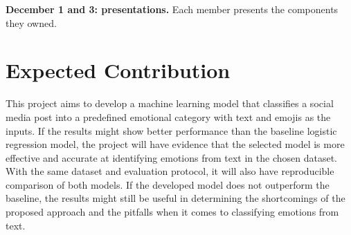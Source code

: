\documentclass[sigconf,nonacm]{acmart}
\begin{document}
\textbf{December 1 and 3: presentations.} Each member presents the components they owned.
\section{Expected Contribution}
This project aims to develop a machine learning model that classifies a social media post into a predefined emotional category with text and emojis as the inputs. If the results might show better performance than the baseline logistic regression model, the project will have evidence that the selected model is more effective and accurate at identifying emotions from text in the chosen dataset. With the same dataset and evaluation protocol, it will also have reproducible comparison of both models. If the developed model does not outperform the baseline, the results might still be useful in determining the shortcomings of the proposed approach and the pitfalls when it comes to classifying emotions from text. 



\end{document}
